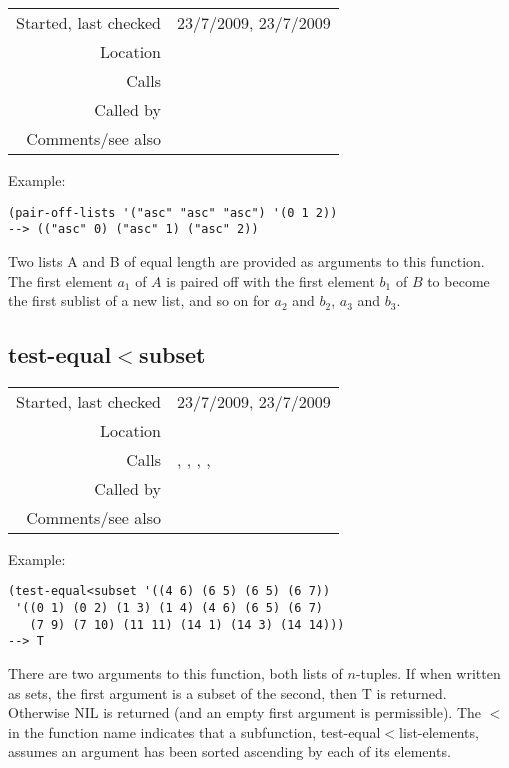 \vspace{0.3cm}
\begin{tabular}{r|p{8cm}}
Started, last checked & 23/7/2009, 23/7/2009 \\
Location & \nameref{sec:projection} \\
Calls & \\
Called by & \\
Comments/see also &
\end{tabular}

\vspace{0.5cm}
\noindent Example:
\begin{verbatim}
(pair-off-lists '("asc" "asc" "asc") '(0 1 2))
--> (("asc" 0) ("asc" 1) ("asc" 2))
\end{verbatim}

\noindent Two lists A and B of equal length are
provided as arguments to this function. The first
element $a_1$ of $A$ is paired off with the first
element $b_1$ of $B$ to become the first sublist of a
new list, and so on for $a_2$ and $b_2$, $a_3$ and
$b_3$.


\subsection*{test-equal$<$subset}\label{fun:test-equal<subset}

\vspace{0.3cm}
\begin{tabular}{r|p{8cm}}
Started, last checked & 23/7/2009, 23/7/2009 \\
Location & \nameref{sec:projection} \\
Calls & \nameref{fun:index-1st-sublist-item<=}, \newline \nameref{fun:index-1st-sublist-item>=}, \nameref{fun:my-last}, \newline \nameref{fun:nth-list-of-lists}, \nameref{fun:test-equal<list-elements} \\
Called by & \\
Comments/see also &
\end{tabular}

\vspace{0.5cm}
\noindent Example:
\begin{verbatim}
(test-equal<subset '((4 6) (6 5) (6 5) (6 7))
 '((0 1) (0 2) (1 3) (1 4) (4 6) (6 5) (6 7)
   (7 9) (7 10) (11 11) (14 1) (14 3) (14 14)))
--> T
\end{verbatim}

\noindent There are two arguments to this function,
both lists of $n$-tuples. If when written as sets, the
first argument is a subset of the second, then T is
returned. Otherwise NIL is returned (and an empty
first argument is permissible). The $<$ in the
function name indicates that a subfunction,
test-equal$<$list-elements, assumes an argument has
been sorted ascending by each of its elements.
















